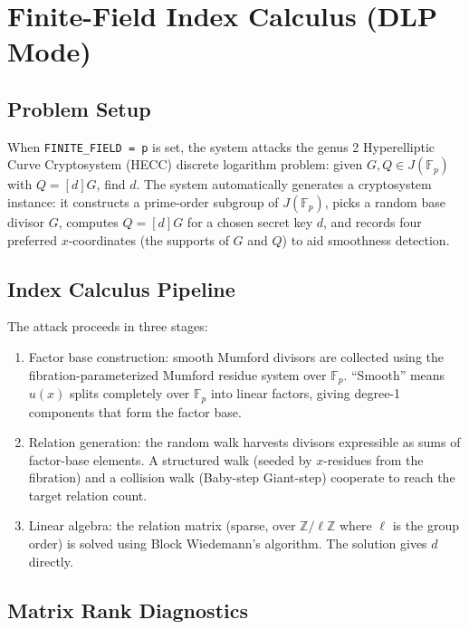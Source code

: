 \documentclass[11pt, a4paper]{article}
\begin{document}
\section{Finite-Field Index Calculus (DLP Mode)}

\subsection{Problem Setup}

When \texttt{FINITE\_FIELD = p} is set, the system attacks the genus 2 Hyperelliptic Curve Cryptosystem (HECC) discrete logarithm problem: given $G, Q \in J(\mathbb{F}_p)$ with $Q = [d]G$, find $d$. The system automatically generates a cryptosystem instance: it constructs a prime-order subgroup of $J(\mathbb{F}_p)$, picks a random base divisor $G$, computes $Q = [d]G$ for a chosen secret key $d$, and records four preferred $x$-coordinates (the supports of $G$ and $Q$) to aid smoothness detection.

\subsection{Index Calculus Pipeline}

The attack proceeds in three stages:

\begin{enumerate}
    \item Factor base construction: smooth Mumford divisors are collected using the fibration-parameterized Mumford residue system over $\mathbb{F}_p$. ``Smooth'' means $u(x)$ splits completely over $\mathbb{F}_p$ into linear factors, giving degree-1 components that form the factor base.
    \item Relation generation: the random walk harvests divisors expressible as sums of factor-base elements. A structured walk (seeded by $x$-residues from the fibration) and a collision walk (Baby-step Giant-step) cooperate to reach the target relation count.
    \item Linear algebra: the relation matrix (sparse, over $\mathbb{Z}/\ell\mathbb{Z}$ where $\ell$ is the group order) is solved using Block Wiedemann's algorithm. The solution gives $d$ directly.
\end{enumerate}

\subsection{Matrix Rank Diagnostics}
\end{document}
